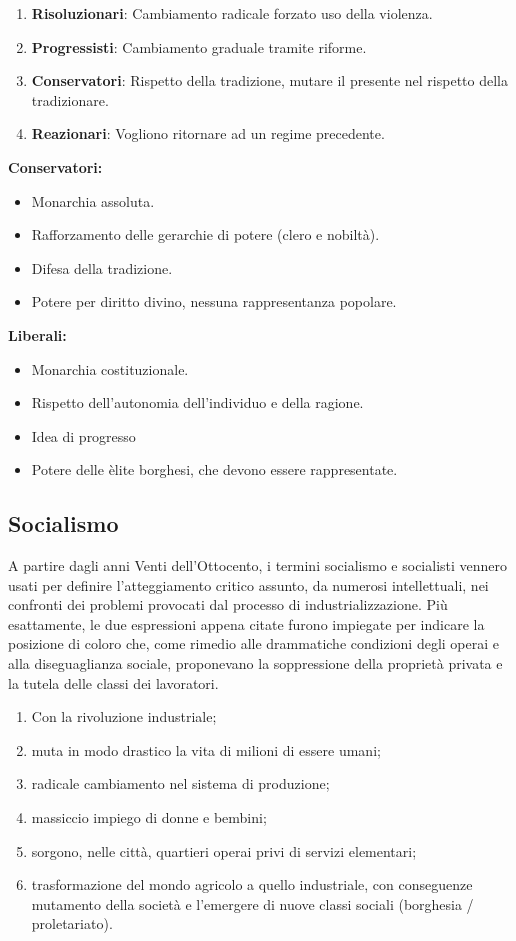 \documentclass[a4paper]{article}
\begin{document}
\begin{enumerate}
    \item \textbf{Risoluzionari}: Cambiamento radicale forzato uso della violenza.
    \item \textbf{Progressisti}: Cambiamento graduale tramite riforme.
    \item \textbf{Conservatori}: Rispetto della tradizione, mutare il presente nel rispetto della tradizionare.
    \item \textbf{Reazionari}: Vogliono ritornare ad un regime precedente.
\end{enumerate}

\textbf{Conservatori:}
\begin{itemize}
    \item Monarchia assoluta.
    \item Rafforzamento delle gerarchie di potere (clero e nobiltà).
    \item Difesa della tradizione.
    \item Potere per diritto divino, nessuna rappresentanza popolare.
\end{itemize}

\textbf{Liberali:}
\begin{itemize}
    \item Monarchia costituzionale.
    \item Rispetto dell'autonomia dell'individuo e della ragione.
    \item Idea di progresso
    \item Potere delle èlite borghesi, che devono essere rappresentate.
\end{itemize}

\subsection{Socialismo}

A partire dagli anni Venti dell'Ottocento, i termini socialismo e socialisti vennero usati per
definire l'atteggiamento critico assunto, da numerosi intellettuali, nei confronti dei
problemi provocati dal processo di industrializzazione. Più esattamente, le due espressioni
appena citate furono impiegate per indicare la posizione di coloro che, come rimedio alle
drammatiche condizioni degli operai e alla diseguaglianza sociale, proponevano la
soppressione della proprietà privata e la tutela delle classi dei lavoratori.

\begin{enumerate}
    \item Con la rivoluzione industriale;
    \item muta in modo drastico la vita di milioni di essere umani;
    \item radicale cambiamento nel sistema di produzione;
    \item massiccio impiego di donne e bembini;
    \item sorgono, nelle città, quartieri operai privi di servizi elementari;
    \item trasformazione del mondo agricolo a quello industriale, con conseguenze mutamento della società e l'emergere di nuove classi sociali (borghesia / proletariato).
\end{enumerate}
\end{document}
